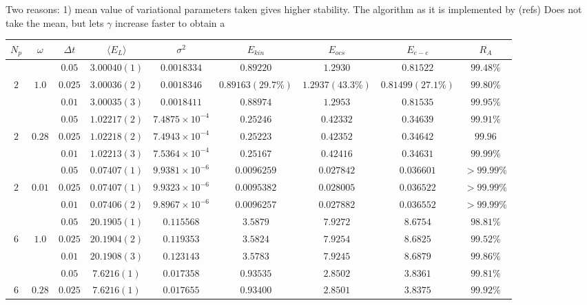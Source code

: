 \documentclass[a4paper,10pt,twocolumn]{article} %
\newcommand{\expec}[1]{\langle{}{#1}\rangle{}}
\begin{document}
Two reasons: 1) mean value of variational parameters taken gives higher stability.
The algorithm as it is implemented by (refs) Does not take the mean, but lets $\gamma$ increase faster to obtain a 

\begin{table*}[ht!]
\begin{center}
\begin{tabular}{|c|c|c|c|c|c|c|c|c|}
\hline
$N_{p}$ & $\omega$ & $\Delta t$ & $\expec{E_L}$ & $\sigma^2$ & $E_{kin}$ & $E_{ocs}$ & $E_{e-e}$ & $R_A$\\ 
\hline
\hline
  &  			& $0.05$  & $3.00040(1)$ & $0.0018334$ & $0.89220$ & $1.2930$ & $0.81522$ & $99.48\%$\\ 
$ 2 $ & $1.0$ 	& $0.025$ & $3.00036(2)$ & $0.0018346$ & $0.89163(29.7\%)$ & $1.2937(43.3\%)$ & $0.81499(27.1\%)$ & $99.80\%$\\ 
  & 		 	& $0.01$  & $3.00035(3)$ & $0.0018411$ & $0.88974$ & $1.2953$ & $0.81535$ & $99.95\%$\\ 
\hline
  	& 	 		& $0.05$   & $1.02217(2)$ & $7.4875\times10^{-4}$ & $0.25246$ & $0.42332$ & $0.34639$ & $99.91\%$\\ 
$2$ & $0.28$&  	$0.025$  & $1.02218(2)$ & $7.4943\times10^{-4}$ & $0.25223$ & $0.42352$ & $0.34642$ & $99.96$\\ 
  	& 	 		& $0.01$   & $1.02213(3)$ & $7.5364\times10^{-4}$ & $0.25167$ & $0.42416$ & $0.34631$ & $99.99\%$\\ 
\hline
  &  			& $0.05$   & $0.07407(1)$ & $9.9381\times10^{-6}$ & $0.0096259$ & $0.027842$ & $0.036601$ & $>99.99\%$\\ 
  $2$&$0.01$ 	& $0.025$  & $0.07407(1)$ & $9.9323\times10^{-6}$ & $0.0095382$ & $0.028005$ & $0.036522$ & $>99.99\%$\\ 
  & 			& $0.01$   & $0.07406(2)$ & $9.8967\times10^{-6}$ & $0.0096257$ & $0.027882$ & $0.036552$ & $>99.99\%$\\ 
\hline
\hline
 	 & 			& $0.05$  & $20.1905(1)$ & $0.115568$ & $3.5879$ & $7.9272$ & $8.6754$ & $98.81\%$\\ 
 $6$ & 	$1.0$	& $0.025$ & $20.1904(2)$ & $0.119353$ & $3.5824$ & $7.9254$ & $8.6825$ & $99.52\%$\\ 
 	 & 		 	& $0.01$  & $20.1908(3)$ & $0.123143$ & $3.5783$ & $7.9245$ & $8.6879$ & $99.86\%$\\ 
\hline
 	 &  		& $0.05$  & $7.6216(1)$ & $0.017358$ & $0.93535$ & $2.8502$ & $3.8361$ & $99.81\%$\\
 $6$ &  $0.28$	& $0.025$ & $7.6216(1)$ & $0.017655$ & $0.93400$ & $2.8501$ & $3.8375$ & $99.92\%$\\ 

\end{tabular}
\end{center}
\end{table*}
\end{document}
